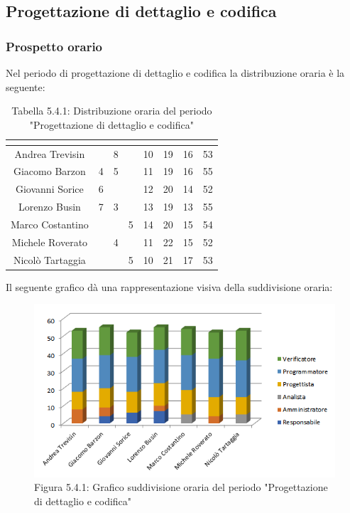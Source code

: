 \subsection{Progettazione di dettaglio e codifica}

\subsubsection{Prospetto orario}
Nel periodo di progettazione di dettaglio e codifica la distribuzione oraria è la seguente:

\renewcommand{\arraystretch}{1.5}
\begin{table}[H]
\begin{center}
\begin{tabular}{|c|c|c|c|c|c|c|c|}
\hline
\rowcolor{title_row}
\textbf{\color{title_text}{Nome}} & \textbf{\color{title_text}{Resp.}} & \textbf{\color{title_text}{Ammi.}} & \textbf{\color{title_text}{Analist.}} & \textbf{\color{title_text}{Progett.}} & \textbf{\color{title_text}{Program.}} & \textbf{\color{title_text}{Verific.}} & \textbf{\color{title_text}{Totale}} \\ \hline
Andrea Trevisin  & & 8 & & 10 & 19 & 16 & 53  \\ \hline
Giacomo Barzon   & 4 & 5 & & 11 & 19 & 16 & 55 \\ \hline
Giovanni Sorice  & 6 & & & 12 & 20 & 14 & 52  \\ \hline
Lorenzo Busin    & 7 & 3 & & 13 & 19 & 13 & 55  \\ \hline
Marco Costantino & & & 5 & 14 & 20 & 15 & 54 \\ \hline
Michele Roverato & & 4 & & 11 & 22 & 15 & 52  \\ \hline
Nicolò Tartaggia & & & 5 & 10 & 21 & 17 & 53  \\ \hline
\end{tabular}
\caption{Tabella 5.4.1: Distribuzione oraria del periodo "Progettazione di dettaglio e codifica"\label{}}
\end{center}
\end{table}
\renewcommand{\arraystretch}{1}

Il seguente grafico dà una rappresentazione visiva della suddivisione oraria: \\
\begin{figure} [H]
	\centering
	\includegraphics[scale=1]{Res/ExcelGrafici/Grafici/CodificaOre.png}
	\caption{Figura 5.4.1: Grafico suddivisione oraria del periodo "Progettazione di dettaglio e codifica"}\label{}
\end{figure}


